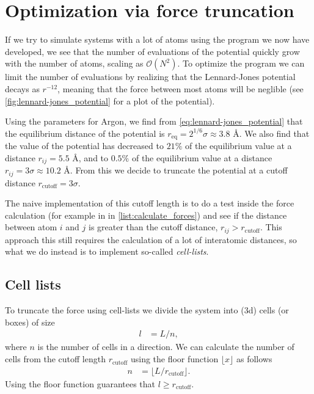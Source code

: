 \section{Optimization via force truncation\label{sec:cell_lists}}
If we try to simulate systems with a lot of atoms using the program we now have developed, we see that the number of evaluations of the potential quickly grow with the number of atoms, scaling as $\mathcal{O}(N^2)$. To optimize the program we can limit the number of evaluations by realizing that the Lennard-Jones potential decays as $r^{-12}$, meaning that the force between most atoms will be neglible (see \cref{fig:lennard-jones_potential} for a plot of the potential). 

Using the parameters for Argon, we find from \cref{eq:lennard-jones_potential} that the equilibrium distance of the potential is $r_{\text{eq}} =  2^{1/6}\sigma \approx 3.8 \text{~\AA}$. We also find that the value of the potential has decreased to $21\%$ of the equilibrium value at a distance $r_{ij} =  5.5$ \AA, and to $0.5\%$ of the equilibrium value at a distance $r_{ij} =  3\sigma \approx 10.2\text{~\AA}$. From this we decide to truncate the potential at a cutoff distance $r_\text{cutoff} = 3\sigma$.
%
%

The naive implementation of this cutoff length is to do a test inside the force calculation (for example in  in \cref{list:calculate_forces}) and see if the distance between atom $i$ and $j$ is greater than the cutoff distance, $r_{ij} > r_\text{cutoff}$. This approach this still requires the calculation of a lot of interatomic distances, so what we do instead is to implement so-called \emph{cell-lists}. 

\subsection{Cell lists}
To truncate the force using cell-lists we divide the system into (3d) cells (or boxes) of size 
\begin{align*}
    l &= L/n,
\end{align*}
where $n$ is the number of cells in a direction. We can calculate the number of cells from the cutoff length $r_\text{cutoff}$ using the floor function $\lfloor x \rfloor$ as follows
\begin{align*}
    n &= \lfloor  L/r_\text{cutoff} \rfloor.
\end{align*}
Using the floor function guarantees that $l \geq r_\text{cutoff}$. 

